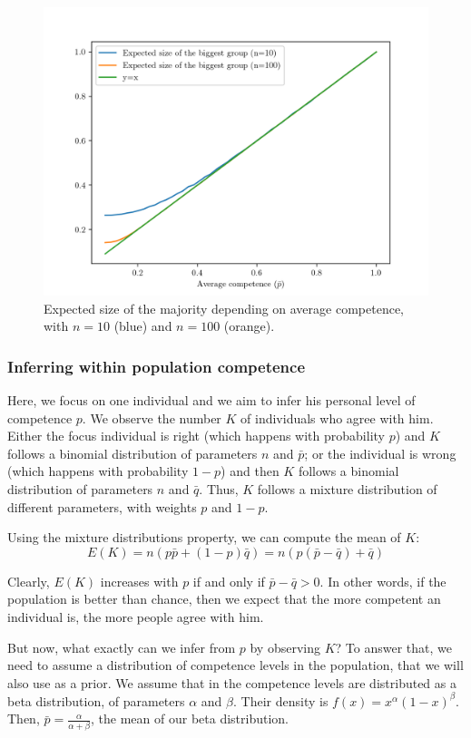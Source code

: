 \documentclass[
  doc,floatsintext]{apa6}
\begin{document}
\begin{figure}

\includegraphics[width=0.75\linewidth]{figures/Benoit_biggest_group} \hfill{}

\caption{Expected size of the majority depending on average competence, with \(n=10\) (blue) and \(n=100\) (orange).}\label{fig:biggestgroup}
\end{figure}

\subsubsection{Inferring within population competence}\label{inferring-within-population-competence}

Here, we focus on one individual and we aim to infer his personal level of competence \(p\). We observe the number \(K\) of individuals who agree with him. Either the focus individual is right (which happens with probability \(p\)) and \(K\) follows a binomial distribution of parameters \(n\) and \(\bar p\); or the individual is wrong (which happens with probability \(1-p\)) and then \(K\) follows a binomial distribution of parameters \(n\) and \(\bar q\). Thus, \(K\) follows a mixture distribution of different parameters, with weights \(p\) and \(1-p\).

Using the mixture distributions property, we can compute the mean of \(K\):
\[
E(K) = n(p \bar p + (1-p)\bar q) = n(p (\bar p - \bar q) + \bar q)
\]

Clearly, \(E(K)\) increases with \(p\) if and only if \(\bar p - \bar q > 0\). In other words, if the population is better than chance, then we expect that the more competent an individual is, the more people agree with him.

But now, what exactly can we infer from \(p\) by observing \(K\)? To answer that, we need to assume a distribution of competence levels in the population, that we will also use as a prior. We assume that in the competence levels are distributed as a beta distribution, of parameters \(\alpha\) and \(\beta\). Their density is \(f(x) = x^\alpha(1-x)^\beta\). Then, \(\bar p = \frac{\alpha}{\alpha+\beta}\), the mean of our beta distribution.
\end{document}
